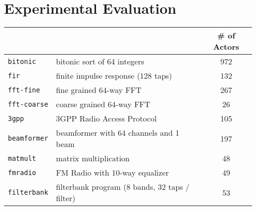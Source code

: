 \section{Experimental Evaluation}
\label{sec:evaluation}

\begin{table}[t]
\nocaptionrule
\center
\label{tab:benchmarks}
{\scriptsize
\begin{tabular}{|l|l|c|} \hline
\hspace{-2pt}{\bf Benchmark}&\hspace{-2pt}{\bf Description}& \hspace{-6pt} {\bf \# of Actors} \hspace{-6pt} \\ \hline \hline
\hspace{-2pt}\texttt{bitonic	} &\hspace{-2pt}bitonic sort of 64 integers	&	972 \\ \hline
\hspace{-2pt}\texttt{fir	      } &\hspace{-2pt} finite impulse response (128 taps)&	132 \\ \hline
\hspace{-2pt}\texttt{fft-fine	} &\hspace{-2pt}fine grained 64-way FFT	&	267 \\ \hline
\hspace{-2pt}\texttt{fft-coarse}\hspace{-2pt} &\hspace{-2pt}coarse grained 64-way FFT	&	26 \\ \hline
\hspace{-2pt}\texttt{3gpp	} &\hspace{-2pt}3GPP Radio Access Protocol	&	105 \\ \hline
\hspace{-2pt}\texttt{beamformer} & \hspace{-2pt}beamformer with 64 channels and 1 beam & 197 \\ \hline
\hspace{-2pt}\texttt{matmult	} & \hspace{-2pt}matrix multiplication	&	48 \\ \hline
\hspace{-2pt}\texttt{fmradio	} & \hspace{-2pt}FM Radio with 10-way equalizer	&	49 \\ \hline
\hspace{-2pt}\texttt{filterbank}\hspace{-2pt} & \hspace{-2pt}filterbank program (8 bands, 32 taps / filter)	&	53 \\ \hline

\end{tabular}}
\end{table}
